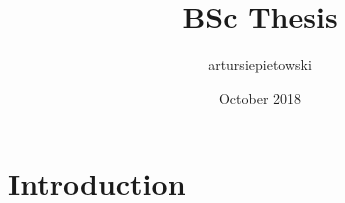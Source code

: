 \documentclass{article}
\title{BSc Thesis}
\author{artursiepietowski }
\date{October 2018}
\begin{document}
\maketitle

\section{Introduction}
\end{document}
